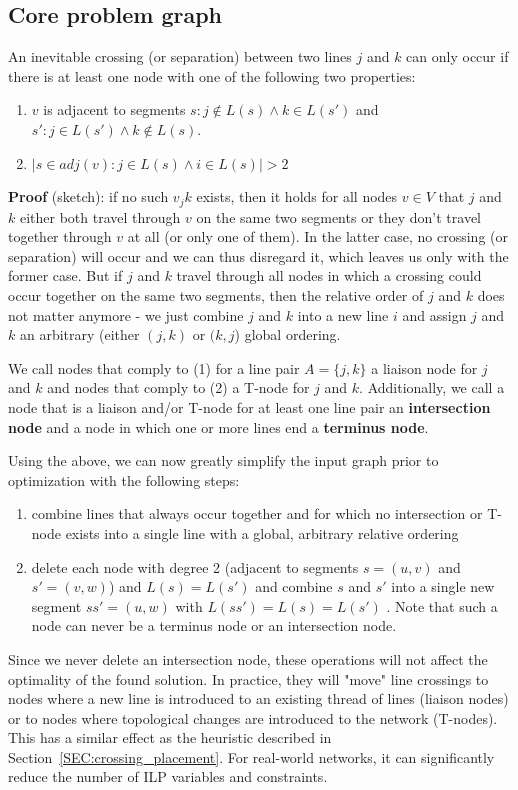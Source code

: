 \documentclass{llncs}
\begin{document}
%
\subsection{Core problem graph}\label{SEC:coreprobgraph}
%
An inevitable crossing (or separation) between two lines $j$ and $k$ can only occur if there is at least one node with one of the following two properties:
\begin{enumerate}
\item $v$ is adjacent to segments $s : j \not\in L(s) \land k \in L(s')$ and $s' : j \in L(s') \land k \not\in L(s)$.
\item $|{s \in adj(v) : j \in L(s) \land i \in L(s)}| > 2$
\end{enumerate}
\textbf{Proof} (sketch): if no such $v_jk$ exists, then it holds for all nodes $v \in V$ that $j$ and $k$ either both travel through $v$ on the same two segments or they don't travel together through $v$ at all (or only one of them). In the latter case, no crossing (or separation) will occur and we can thus disregard it, which leaves us only with the former case. But if $j$ and $k$ travel through all nodes in which a crossing could occur together on the same two segments, then the relative order of $j$ and $k$ does not matter anymore - we just combine $j$ and $k$ into a new line $i$ and assign $j$ and $k$ an arbitrary (either $(j,k)$ or $(k, j$) global ordering.

We call nodes that comply to (1) for a line pair $A = \{j, k\}$ a liaison node for $j$ and $k$ and nodes that comply to (2) a T-node for $j$ and $k$. Additionally, we call a node that is a liaison and/or T-node for at least one line pair an \textbf{intersection node} and a node in which one or more lines end a \textbf{terminus node}.

Using the above, we can now greatly simplify the input graph prior to optimization with the following steps:
\begin{enumerate}
\item combine lines that always occur together and for which no intersection or T-node exists into a single line with a global, arbitrary relative ordering
\item delete each node with degree 2 (adjacent to segments $s = (u, v)$ and $s' = (v, w)$) and $L(s) = L(s')$ and combine $s$ and $s'$ into a single new segment $ss' = (u, w)$ with $L(ss') = L(s) = L(s')$ . Note that such a node can never be a terminus node or an intersection node.
\end{enumerate}
Since we never delete an intersection node, these operations will not affect the optimality of the found solution. In practice, they will "move" line crossings to nodes where a new line is introduced to an existing thread of lines (liaison nodes) or to nodes where topological changes are introduced to the network (T-nodes). This has a similar effect as the heuristic described in Section~\ref{SEC:crossing_placement}. For real-world networks, it can significantly reduce the number of ILP variables and constraints.
\end{document}
